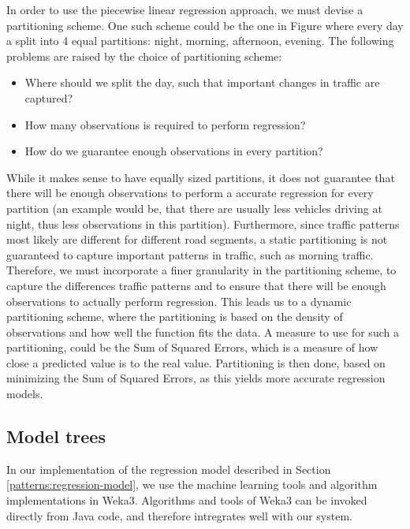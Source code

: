 In order to use the piecewise linear regression approach, we must devise a partitioning scheme. One such scheme could be the one in Figure \label{fig:segmented-regression} where every day a split into 4 equal partitions: night, morning, afternoon, evening. The following problems are raised by the choice of partitioning scheme:
\begin{itemize}
	\item Where should we split the day, such that important changes in traffic are captured?
	\item How many observations is required to perform regression?
	\item How do we guarantee enough observations in every partition?
\end{itemize}
While it makes sense to have equally sized partitions, it does not guarantee that there will be enough observations to perform a accurate regression for every partition (an example would be, that there are usually less vehicles driving at night, thus less observations in this partition). Furthermore, since traffic patterns most likely are different for different road segments, a static partitioning is not guaranteed to capture important patterns in traffic, such as morning traffic. Therefore, we must incorporate a finer granularity in the partitioning scheme, to capture the differences traffic patterns and to ensure that there will be enough observations to actually perform regression.
This leads us to a dynamic partitioning scheme, where the partitioning is based on the density of observations and how well the function fits the data. A measure to use for such a partitioning, could be the Sum of Squared Errors, which is a measure of how close a predicted value is to the real value. Partitioning is then done, based on minimizing the Sum of Squared Errors, as this yields more accurate regression models.

\subsection{Model trees}\label{patterns:weka}
In our implementation of the regression model described in Section \ref{patterns:regression-model}, we use the machine learning tools and algorithm implementations in Weka3. Algorithms and tools of Weka3 can be invoked directly from Java code, and therefore intregrates well with our system.


